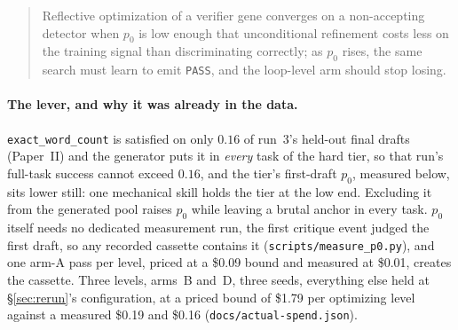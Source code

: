 \documentclass[11pt]{article}
\begin{document}
\begin{quote}
Reflective optimization of a verifier gene converges on a non-accepting detector when $p_0$ is
low enough that unconditional refinement costs less on the training signal than discriminating
correctly; as $p_0$ rises, the same search must learn to emit \texttt{PASS}, and the loop-level
arm should stop losing.
\end{quote}

\paragraph{The lever, and why it was already in the data.}
\texttt{exact\_word\_count} is satisfied on only $0.16$ of run~3's held-out final drafts
(Paper~II) and the generator puts it in \emph{every} task of the hard tier, so that run's
full-task success cannot exceed $0.16$, and the tier's first-draft $p_0$, measured below, sits
lower still: one mechanical skill holds the tier at the low end. Excluding it from the generated
pool raises $p_0$ while leaving a brutal anchor in every
task. $p_0$ itself needs no dedicated measurement run, the first critique event judged the
first draft, so any recorded cassette contains it
(\texttt{scripts/measure\_p0.py}), and one arm-A pass per level, priced at a \$0.09 bound and
measured at \$0.01, creates the cassette. Three levels, arms~B and~D, three seeds, everything
else held at \S\ref{sec:rerun}'s configuration, at a priced bound of \$1.79 per optimizing level
against a measured \$0.19 and \$0.16 (\texttt{docs/actual-spend.json}).
\end{document}
